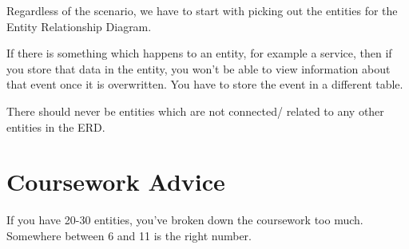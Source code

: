 
Regardless of the scenario, we have to start with picking out the entities for the Entity Relationship Diagram. 

If there is something which happens to an entity, for example a service, then if you store that data in the entity, you won't be able to view information about that event once it is overwritten. You have to store the event in a different table.

There should never be entities which are not connected/ related to any other entities in the ERD.

\section*{Coursework Advice}
If you have 20-30 entities, you've broken down the coursework too much. Somewhere between 6 and 11 is the right number.

